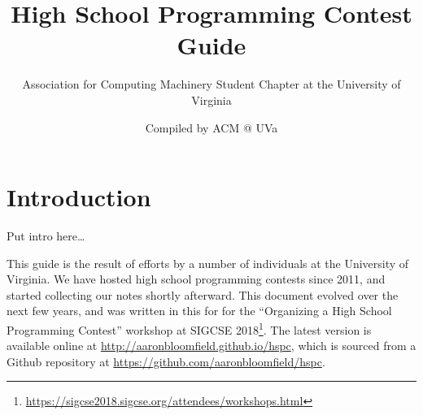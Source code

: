 \documentclass[11pt,twoside,letterpaper]{book}
\title {\thetitle}
\author{Association for Computing Machinery Student Chapter at the University of Virginia}
\newcommand{\footurl}[1]{\footnote{\scriptsize\url{#1}}}
\begin{document}
\title {\huge High School Programming Contest Guide \\
\vspace{1in}
\vspace{1in}
}
\author {\Large Compiled by ACM @ UVa}
\maketitle

\cleardoublepage

\tableofcontents

\cleardoublepage
\chapter{Introduction}

Put intro here\ldots

This guide is the result of efforts by a number of individuals at the
University of Virginia.  We have hosted high school programming
contests since 2011, and started collecting our notes shortly
afterward.  This document evolved over the next few years, and was
written in this for for the ``Organizing a High School Programming
Contest'' workshop at SIGCSE
2018\footurl{https://sigcse2018.sigcse.org/attendees/workshops.html}.
The latest version is available online at
\url{http://aaronbloomfield.github.io/hspc}, which is sourced from a
Github repository at \url{https://github.com/aaronbloomfield/hspc}.
\end{document}
